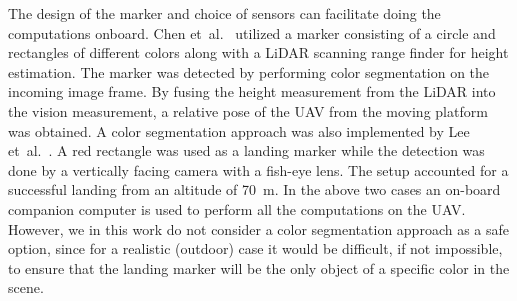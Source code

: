\documentclass[conference, onecolumn, draftclsnofoot]{IEEEtran}
\begin{document}





The design of the marker and choice of sensors can facilitate doing the computations onboard. %
%
Chen et~al.~\cite{chen2016system} utilized a marker consisting of a
circle and rectangles of different colors along with a LiDAR scanning
range finder for height estimation. The marker was detected by
performing color segmentation on the incoming image frame. By fusing
the height measurement from the LiDAR into the vision measurement, a
relative pose of the UAV from the moving platform was obtained. A
color segmentation approach was also implemented by Lee
et~al.~\cite{lee2016vision}. A red rectangle was used as a landing marker while the detection was done by a vertically facing camera with a fish-eye lens. The setup accounted for a successful landing from an altitude of \SI{70}{\m}. In the above two cases an on-board companion computer is used to
perform all the computations on the UAV. However, we in this work do not consider a color segmentation
approach as a safe option, since for a realistic (outdoor)
case it would be difficult, if not impossible, to ensure that the
landing marker will be the only object of a specific color in the
scene.
\end{document}
